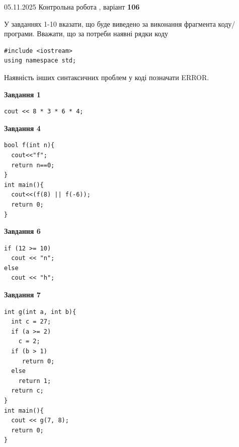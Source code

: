 \documentclass[12pt, ukrainian]{article}
\begin{document}
{\Large{05.11.2025 Контрольна робота , варіант  \No \textbf { 106 }\par}}
{
\begin {large}
У завданнях 1-10 вказати, що буде виведено за виконання фрагмента коду/про\-гра\-ми.
Вважати, що за потреби наявні рядки коду
\begin{verbatim}
#include <iostream>
using namespace std;
\end{verbatim}
Наявність інших синтаксичних проблем у коді позначати ERROR.

\begin{minipage}[t]{7.0cm}

\begin{center}
\textbf{Завдання 1}
\end{center}
\vspace{-8mm}

\begin{verbatim}
cout << 8 * 3 * 6 * 4;
\end{verbatim}



\begin{center}
\textbf{Завдання 4}
\end{center}
\vspace{-8mm}

\begin{verbatim}
bool f(int n){
  cout<<"f";
  return n==0;
}
int main(){
  cout<<(f(8) || f(-6));
  return 0;
}
\end{verbatim}



\begin{center}
\textbf{Завдання 6}
\end{center}
\vspace{-8mm}

\begin{verbatim}
if (12 >= 10)
  cout << "n";
else
  cout << "h";
\end{verbatim}



\begin{center}
\textbf{Завдання 7}
\end{center}
\vspace{-8mm}

\begin{verbatim}
int g(int a, int b){
  int c = 27;
  if (a >= 2)
    c = 2;
  if (b > 1)
     return 0;
  else
    return 1;
  return c;
}
int main(){
  cout << g(7, 8);
  return 0;
}
\end{verbatim}


\end{minipage}
\end{large}}
\end{document}
